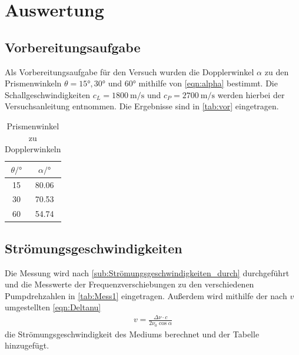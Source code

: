 \section{Auswertung}
\label{sec:Auswertung}

\subsection{Vorbereitungsaufgabe}
Als Vorbereitungsaufgabe für den Versuch wurden die Dopplerwinkel $\alpha$ zu den Prismenwinkeln $\theta = 15° , 30°$ und $60°$
mithilfe von \autoref{eqn:alpha} bestimmt.
Die Schallgeschwindigkeiten $c_L=\qty{1800}{\meter\per\second}$ und $c_P=\qty{2700}{\meter\per\second}$ werden hierbei der Versuchsanleitung
\cite{VUS3} entnommen.
Die Ergebnisse sind in \autoref{tab:vor} eingetragen.

\begin{table}
    \centering
    \caption{Prismenwinkel zu Dopplerwinkeln}
    \begin{tabular}{S[table-format=2.0] S[table-format=2.2]}
        \toprule
        {$\theta / \si{\degree}$} & {$\alpha  / \si{\degree}$}  \\
         & 80.06  \\
        30 & 70.53  \\
        60 & 54.74  \\
        \bottomrule
    \end{tabular}
    \label{tab:vor}
\end{table}

\subsection{Strömungsgeschwindigkeiten}
\label{sub:Strömungsgeschwindigkeiten}

Die Messung wird nach \autoref{sub:Strömungsgeschwindigkeiten_durch} durchgeführt und die Messwerte der Frequenzverschiebungen
zu den verschiedenen Pumpdrehzahlen in \autoref{tab:Mess1} eingetragen.
Außerdem wird mithilfe der nach $v$ umgestellten \autoref{eqn:Deltanu}
\begin{align}
  v= \frac{\Delta \nu \cdot c}{2 \nu_0 \cos{\alpha}} \label{eqn:v}
\end{align}
die Strömungsgeschwindigkeit des Mediums berechnet und der Tabelle hinzugefügt. 


